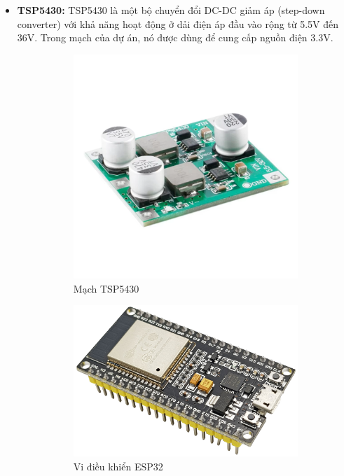 \begin{itemize}
\begin{itemize}
            
        \item \textbf{TSP5430:} TSP5430 là một bộ chuyển đổi DC-DC giảm áp (step-down converter) với khả năng hoạt động ở dải điện áp đầu vào rộng từ 5.5V đến 36V. Trong mạch của dự án, nó được dùng để cung cấp nguồn điện 3.3V.
        \begin{figure}[h!]
            \centering
            \begin{subfigure}{0.49\textwidth}
                \centering
                \includegraphics[width=\textwidth]{graphics/section2/TPS5430.png}
                \caption*{Mạch TSP5430}
            \end{subfigure}
            \hfill
            \begin{subfigure}{0.49\textwidth}
                \centering
                \includegraphics[width=\textwidth]{graphics/section2/ESP32.png}
                \caption*{Vi điều khiển ESP32}
            \end{subfigure}
            \caption*{}
        \end{figure}
        \end{itemize}
        

\end{itemize}
